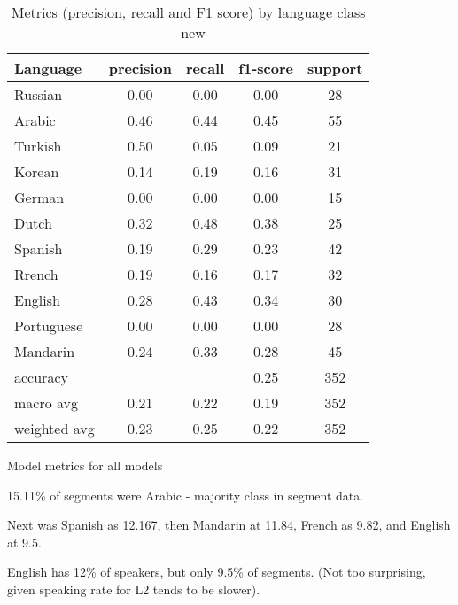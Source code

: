 \documentclass[11pt, letterpaper]{article}
\begin{document}
\begin{table}
\begin{center}
\caption{Metrics (precision, recall and F1 score) by language class - new}
\begin{tabular}{l c c c c}
Language  &precision &recall	&f1-score	&support \\ \hline
Russian	&0.00	&0.00	&0.00	&28\\
Arabic	&0.46	&0.44	&0.45	&55\\     
Turkish	&0.50	&0.05	&0.09	&21\\      
Korean	&0.14	&0.19 	&0.16	&31\\      
German	&0.00	&0.00	&0.00	&15\\       
Dutch	&0.32	&0.48	&0.38	&25\\   
Spanish	&0.19	&0.29	&0.23	&42\\      
Rrench	&0.19	&0.16	&0.17	&32\\    
English	&0.28	&0.43	&0.34	&30\\  
Portuguese&0.00	&0.00	&0.00	&28\\    
Mandarin	&0.24	&0.33	&0.28	&45\\ \hline
      
accuracy		&		&		&0.25	&352\\
macro avg		& 0.21	&0.22	&0.19	&352\\
weighted avg	& 0.23	&0.25	&0.22	&352\\ \hline
\end{tabular}
\end{center}
\end{table}


Model metrics for all models

15.11\% of segments were Arabic - majority class in segment data.

Next was Spanish as 12.167, then Mandarin at 11.84, French as 9.82, and English at 9.5.

English has 12\% of speakers, but only 9.5\% of segments. (Not too surprising, given speaking rate for L2 tends to be slower).
\end{document}
